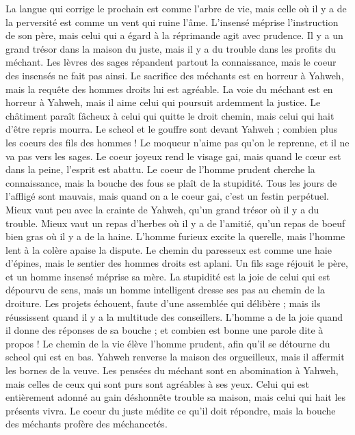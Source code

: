 \begin{multicols}{2}
La langue qui corrige le prochain est comme l'arbre de vie, mais celle où il y a de la perversité est comme un vent qui ruine l’âme.
L’insensé méprise l'instruction de son père, mais celui qui a égard à la réprimande agit avec prudence.
Il y a un grand trésor dans la maison du juste, mais il y a du trouble dans les profits du méchant.
Les lèvres des sages répandent partout la connaissance, mais le coeur des insensés ne fait pas ainsi.
Le sacrifice des méchants est en horreur à Yahweh, mais la requête des hommes droits lui est agréable.
La voie du méchant est en horreur à Yahweh, mais il aime celui qui poursuit ardemment la justice.
Le châtiment paraît fâcheux à celui qui quitte le droit chemin, mais celui qui hait d'être repris mourra.
Le scheol et le gouffre sont devant Yahweh ; combien plus les coeurs des fils des hommes !
Le moqueur n'aime pas qu'on le reprenne, et il ne va pas vers les sages.
Le coeur joyeux rend le visage gai, mais quand le cœur est dans la peine, l'esprit est abattu.
Le coeur de l'homme prudent cherche la connaissance, mais la bouche des fous se plaît de la stupidité.
Tous les jours de l'affligé sont mauvais, mais quand on a le coeur gai, c'est un festin perpétuel.
Mieux vaut peu avec la crainte de Yahweh, qu'un grand trésor où il y a du trouble.
Mieux vaut un repas d'herbes où il y a de l'amitié, qu'un repas de boeuf bien gras où il y a de la haine.
L'homme furieux excite la querelle, mais l'homme lent à la colère apaise la dispute.
Le chemin du paresseux est comme une haie d’épines, mais le sentier des hommes droits est aplani.
Un fils sage réjouit le père, et un homme insensé méprise sa mère.
La stupidité est la joie de celui qui est dépourvu de sens, mais un homme intelligent dresse ses pas au chemin de la droiture.
Les projets échouent, faute d’une assemblée qui délibère ; mais ils réussissent quand il y a la multitude des conseillers.
L'homme a de la joie quand il donne des réponses de sa bouche ; et combien est bonne une parole dite à propos !
Le chemin de la vie élève l'homme prudent, afin qu'il se détourne du scheol qui est en bas.
Yahweh renverse la maison des orgueilleux, mais il affermit les bornes de la veuve.
Les pensées du méchant sont en abomination à Yahweh, mais celles de ceux qui sont purs sont agréables à ses yeux.
Celui qui est entièrement adonné au gain déshonnête trouble sa maison, mais celui qui hait les présents vivra.
Le coeur du juste médite ce qu'il doit répondre, mais la bouche des méchants profère des méchancetés.

\end{multicols}
